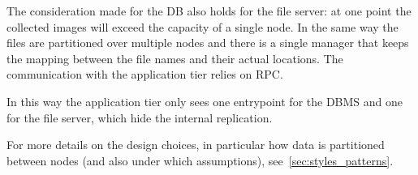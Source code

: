 \begin{description}
    The consideration made for the DB also holds for the file server: at one
    point the collected images will exceed the capacity of a single node.
    In the same way the files are partitioned over multiple nodes and there is
    a single manager that keeps the mapping between the file names and their
    actual locations. The communication with the application tier relies on RPC.
    
    In this way the application tier only sees one entrypoint for the DBMS and
    one for the file server, which hide the internal replication.
\end{description}

\noindent
For more details on the design choices, in particular how data is partitioned
between nodes (and also under which assumptions),
see~\ref{sec:styles_patterns}.
